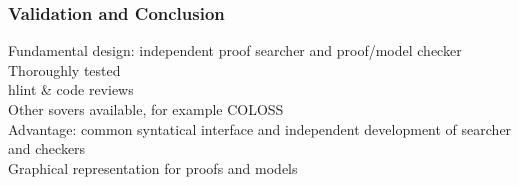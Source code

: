 \begin{frame}
  \frametitle{Validation and Conclusion}
  Fundamental design: independent proof searcher and proof/model checker \\
  Thoroughly tested \\
  hlint \& code reviews \\
  \pause
  \bigskip
  Other sovers available, for example COLOSS \\
  Advantage: common syntatical interface and independent development of searcher and checkers \\
  Graphical representation for proofs and models
\end{frame}

   
    
